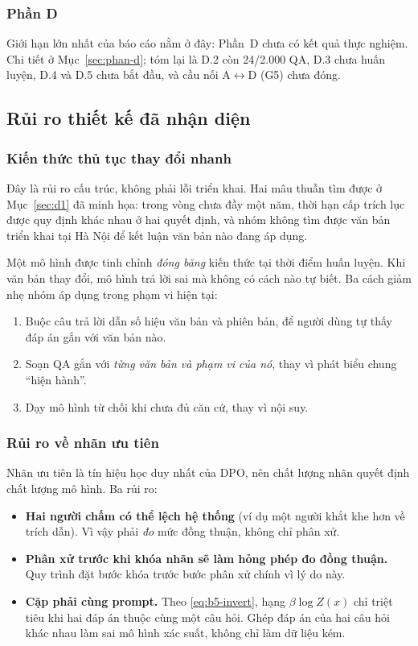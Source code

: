\subsubsection{Phần D}

Giới hạn lớn nhất của báo cáo nằm ở đây: Phần~D chưa có kết quả thực nghiệm. Chi
tiết ở Mục~\ref{sec:phan-d}; tóm lại là D.2 còn 24/2.000 QA, D.3 chưa huấn luyện,
D.4 và D.5 chưa bắt đầu, và cầu nối A$\leftrightarrow$D (G5) chưa đóng.

\subsection{Rủi ro thiết kế đã nhận diện}

\subsubsection{Kiến thức thủ tục thay đổi nhanh}

Đây là rủi ro cấu trúc, không phải lỗi triển khai. Hai mâu thuẫn tìm được ở
Mục~\ref{sec:d1} đã minh họa: trong vòng chưa đầy một năm, thời hạn cấp trích lục
được quy định khác nhau ở hai quyết định, và nhóm không tìm được văn bản triển khai
tại Hà Nội để kết luận văn bản nào đang áp dụng.

Một mô hình được tinh chỉnh \emph{đóng băng} kiến thức tại thời điểm huấn luyện.
Khi văn bản thay đổi, mô hình trả lời sai mà không có cách nào tự biết. Ba cách
giảm nhẹ nhóm áp dụng trong phạm vi hiện tại:

\begin{enumerate}[leftmargin=2em]
\item Buộc câu trả lời dẫn số hiệu văn bản và phiên bản, để người dùng tự thấy đáp
án gắn với văn bản nào.
\item Soạn QA gắn với \emph{từng văn bản và phạm vi của nó}, thay vì phát biểu
chung ``hiện hành''.
\item Dạy mô hình từ chối khi chưa đủ căn cứ, thay vì nội suy.
\end{enumerate}

\subsubsection{Rủi ro về nhãn ưu tiên}

Nhãn ưu tiên là tín hiệu học duy nhất của DPO, nên chất lượng nhãn quyết định chất
lượng mô hình. Ba rủi ro:

\begin{itemize}[leftmargin=2em]
\item \textbf{Hai người chấm có thể lệch hệ thống} (ví dụ một người khắt khe hơn về
trích dẫn). Vì vậy phải \emph{đo} mức đồng thuận, không chỉ phân xử.
\item \textbf{Phân xử trước khi khóa nhãn sẽ làm hỏng phép đo đồng thuận.} Quy
trình đặt bước khóa trước bước phân xử chính vì lý do này.
\item \textbf{Cặp phải cùng prompt.} Theo \eqref{eq:b5-invert}, hạng
$\beta\log Z(x)$ chỉ triệt tiêu khi hai đáp án thuộc cùng một câu hỏi. Ghép đáp án
của hai câu hỏi khác nhau làm sai mô hình xác suất, không chỉ làm dữ liệu kém.
\end{itemize}

